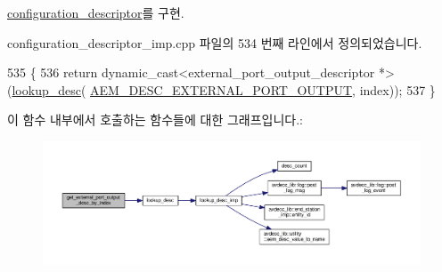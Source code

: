 \hyperlink{classavdecc__lib_1_1configuration__descriptor_a58f09b090b126e803061158bf1e22c5e}{configuration\+\_\+descriptor}를 구현.



configuration\+\_\+descriptor\+\_\+imp.\+cpp 파일의 534 번째 라인에서 정의되었습니다.


\begin{DoxyCode}
535 \{
536     \textcolor{keywordflow}{return} \textcolor{keyword}{dynamic\_cast<}external\_port\_output\_descriptor *\textcolor{keyword}{>}(\hyperlink{classavdecc__lib_1_1configuration__descriptor__imp_a265e068ed32f7c3694417ffe2c382309}{lookup\_desc}(
      \hyperlink{namespaceavdecc__lib_ac7b7d227e46bc72b63ee9e9aae15902fa60159ed7fb6c5bf542208f134c202c67}{AEM\_DESC\_EXTERNAL\_PORT\_OUTPUT}, index));
537 \}
\end{DoxyCode}


이 함수 내부에서 호출하는 함수들에 대한 그래프입니다.\+:
\nopagebreak
\begin{figure}[H]
\begin{center}
\leavevmode
\includegraphics[width=350pt]{classavdecc__lib_1_1configuration__descriptor__imp_a79a19e980fe9bc05842be0d02e6b633f_cgraph}
\end{center}
\end{figure}



